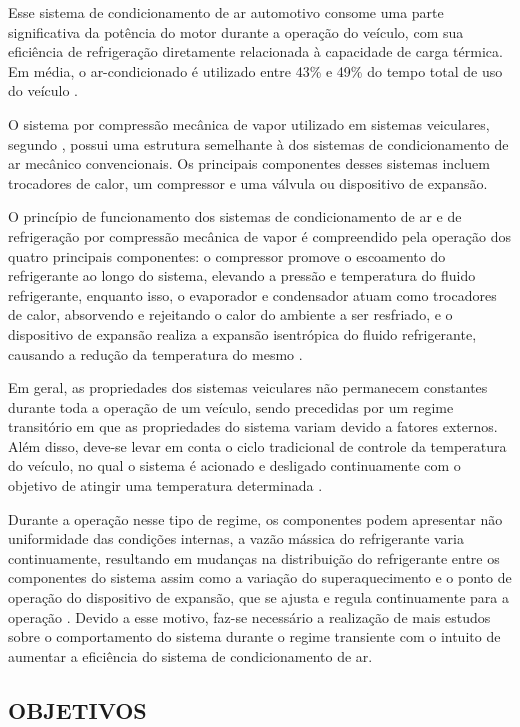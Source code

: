 Esse sistema de condicionamento de ar automotivo consome uma parte significativa da potência do motor durante a operação do veículo, com sua eficiência de refrigeração diretamente relacionada à capacidade de carga térmica. Em média, o ar-condicionado é utilizado entre 43\% e 49\% do tempo total de uso do veículo \cite{farrington2000}.

O sistema por compressão mecânica de vapor utilizado em sistemas veiculares, segundo  \textcite{dasilva2016}, possui uma estrutura semelhante à dos sistemas de condicionamento de ar mecânico convencionais. Os principais componentes desses sistemas incluem trocadores de calor, um compressor e uma válvula ou dispositivo de expansão.

O princípio de funcionamento dos sistemas de condicionamento de ar e de refrigeração por compressão mecânica de vapor é compreendido pela operação dos quatro principais componentes: o compressor promove o escoamento do refrigerante ao longo do sistema, elevando a pressão e temperatura do fluido refrigerante, enquanto isso, o evaporador e condensador atuam como trocadores de calor, absorvendo e rejeitando o calor do ambiente a ser resfriado, e o dispositivo de expansão realiza a expansão isentrópica do fluido refrigerante, causando a redução da temperatura do mesmo \cite{junior2023}.

Em geral, as propriedades dos sistemas veiculares não permanecem constantes durante toda a operação de um veículo, sendo precedidas por um regime transitório em que as propriedades do sistema variam devido a fatores externos. Além disso, deve-se levar em conta o ciclo tradicional de controle da temperatura do veículo, no qual o sistema é acionado e desligado continuamente com o objetivo de atingir uma temperatura determinada \cite{juliani2017}.

Durante a operação nesse tipo de regime, os componentes podem apresentar não uniformidade das condições internas, a vazão mássica do refrigerante varia continuamente, resultando em mudanças na distribuição do refrigerante entre os componentes do sistema assim como a variação do superaquecimento e o ponto de operação do dispositivo de expansão, que se ajusta e regula continuamente para a operação \cite{rangel2007}. Devido a esse motivo, faz-se necessário a realização de mais estudos sobre o comportamento do sistema durante o regime transiente com o intuito de aumentar a eficiência do sistema de condicionamento de ar.

\subsection{OBJETIVOS}

